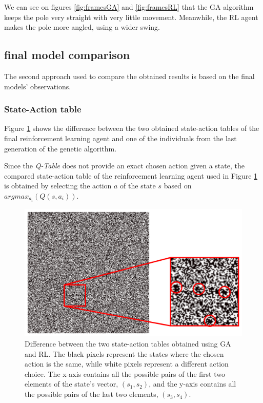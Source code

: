 We can see on figures \ref*{fig:framesGA} and \ref*{fig:framesRL} that the GA algorithm keeps the pole very straight with very little movement.
Meanwhile, the RL agent makes the pole more angled, using a wider swing.

\subsection{final model comparison}

The second approach used to compare the obtained results is based on the final models' observations.

\subsubsection{State-Action table}

Figure \ref{figTABLEDIFF} shows the difference between the two obtained state-action tables of the final reinforcement learning agent and one of the individuals from the last generation of the genetic algorithm.

Since the \textit{Q-Table} does not provide an exact chosen action given a state, the compared state-action table of the reinforcement learning agent used in Figure \ref{figTABLEDIFF} is obtained by selecting the action $a$ of the state $s$ based on $argmax_{a_i} (Q(s,a_i))$.

\begin{figure}[H]
	\centering
	\includegraphics [width=\linewidth]{Images/diff_zoomed.png}
	\caption{Difference between the two state-action tables obtained using GA and RL. The black pixels represent the states where the chosen action is the same, while white pixels represent a different action choice. The x-axis contains all the possible pairs of the first two elements of the state's vector, $(s_1,s_2)$, and the y-axis contains all the possible pairs of the last two elements, $(s_3,s_4)$. }
	\label{figTABLEDIFF}
\end{figure}


